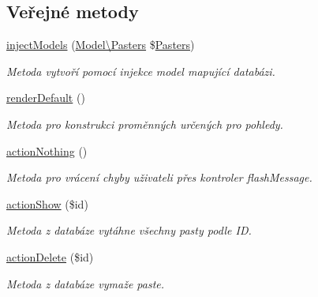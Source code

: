 \subsection*{Veřejné metody}
\begin{DoxyCompactItemize}
\item 
\hyperlink{classApp_1_1Presenters_1_1PastesPresenter_a5424badaa457bbf2973cfd41347d906f}{inject\-Models} (\hyperlink{classApp_1_1Model_1_1Pasters}{Model\textbackslash{}\-Pasters} \$\hyperlink{classApp_1_1Model_1_1Pasters}{Pasters})
\begin{DoxyCompactList}\small\item\em Metoda vytvoří pomocí injekce model mapující databázi. \end{DoxyCompactList}\item 
\hypertarget{classApp_1_1Presenters_1_1PastesPresenter_ad79e35733cf83ac8cd097d9f8aab2879}{\hyperlink{classApp_1_1Presenters_1_1PastesPresenter_ad79e35733cf83ac8cd097d9f8aab2879}{render\-Default} ()}\label{classApp_1_1Presenters_1_1PastesPresenter_ad79e35733cf83ac8cd097d9f8aab2879}

\begin{DoxyCompactList}\small\item\em Metoda pro konstrukci proměnných určených pro pohledy. \end{DoxyCompactList}\item 
\hypertarget{classApp_1_1Presenters_1_1PastesPresenter_af4103edcd31b0e1de8ff857dd1e9dda1}{\hyperlink{classApp_1_1Presenters_1_1PastesPresenter_af4103edcd31b0e1de8ff857dd1e9dda1}{action\-Nothing} ()}\label{classApp_1_1Presenters_1_1PastesPresenter_af4103edcd31b0e1de8ff857dd1e9dda1}

\begin{DoxyCompactList}\small\item\em Metoda pro vrácení chyby uživateli přes kontroler flash\-Message. \end{DoxyCompactList}\item 
\hyperlink{classApp_1_1Presenters_1_1PastesPresenter_afa1eed045c70c8e42b187a281aa7d368}{action\-Show} (\$id)
\begin{DoxyCompactList}\small\item\em Metoda z databáze vytáhne všechny pasty podle I\-D. \end{DoxyCompactList}\item 
\hyperlink{classApp_1_1Presenters_1_1PastesPresenter_ad686b8b2060625dabe5f3c19ca22eed8}{action\-Delete} (\$id)
\begin{DoxyCompactList}\small\item\em Metoda z databáze vymaže paste. \end{DoxyCompactList}\end{DoxyCompactItemize}


